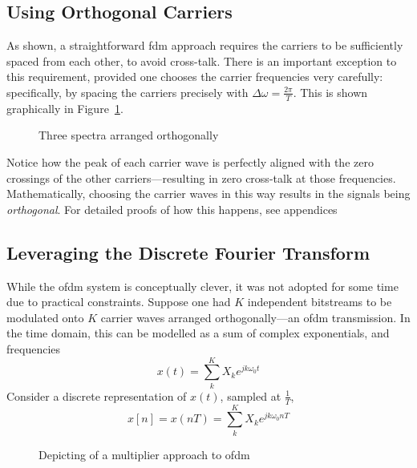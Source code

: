 \documentclass[class=report,11pt,crop=false]{standalone}
\begin{document}
\subsection{Using Orthogonal Carriers}
As shown, a straightforward \gls{fdm} approach requires the carriers to be sufficiently spaced from each other, to avoid cross-talk. There is an important exception to this requirement, provided one chooses the carrier frequencies very carefully: specifically, by spacing the carriers precisely with \(\Delta \omega = \frac{2\pi}{T}\). This is shown graphically in Figure~\ref{fig:ofdm-three-sincs}.

\begin{figure}[htbp]
    \centering
    \captionsetup{type=figure}
    \def\svgwidth{0.7\linewidth}
    { %
        }
    \caption{Three spectra arranged orthogonally}
    \label{fig:ofdm-three-sincs}
\end{figure}

Notice how the peak of each carrier wave is perfectly aligned with the zero crossings of the other carriers---resulting in zero cross-talk at those frequencies. Mathematically, choosing the carrier waves in this way results in the signals being \emph{orthogonal}. For detailed proofs of how this happens, see appendices%

\subsection{Leveraging the Discrete Fourier Transform}
While the \gls{ofdm} system is conceptually clever, it was not adopted for some time due to practical constraints. Suppose one had \(K\) independent bitstreams to be modulated onto \(K\) carrier waves arranged orthogonally---an \gls{ofdm} transmission. In the time domain, this can be modelled as a sum of complex exponentials, and frequencies 
\begin{equation}    
    x(t) = \sum^K_{k} X_k e^{j k \omega_0 t}
\end{equation}
Consider a discrete representation of \(x(t)\), sampled at \(\frac{1}{T}\),
\begin{equation}
    x[n] = x(nT) = \sum^K_{k} X_k e^{j k \omega_0 nT}
\end{equation}


\begin{figure}
    \centering
    \captionsetup{type=figure}
    \def\svgwidth{\linewidth}
    {
        \scriptsize
        
    }
    \caption{Depicting of a multiplier approach to \gls{ofdm}}
    \label{fig:ofdm-multipliers}
\end{figure}
\end{document}
